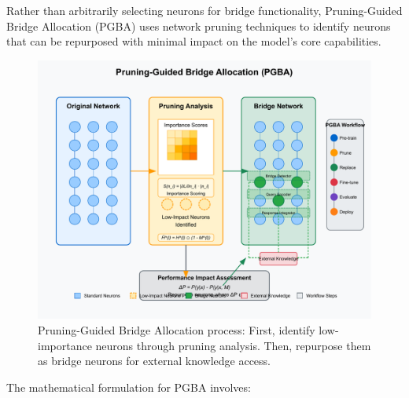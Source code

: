 \documentclass[9pt,a4paper,twocolumn,twoside]{tau-class/tau}
\begin{document}
    Rather than arbitrarily selecting neurons for bridge functionality, Pruning-Guided Bridge Allocation (PGBA) uses network pruning techniques to identify neurons that can be repurposed with minimal impact on the model's core capabilities.

    \begin{figure}[h]
        \centering
        \includegraphics[width=\columnwidth]{figures/figure3_pruning_bridge_allocation.pdf}
        \caption{Pruning-Guided Bridge Allocation process: First, identify low-importance neurons through pruning analysis. Then, repurpose them as bridge neurons for external knowledge access.}
        \label{fig:pgba}
    \end{figure}

    The mathematical formulation for PGBA involves:
\end{document}
